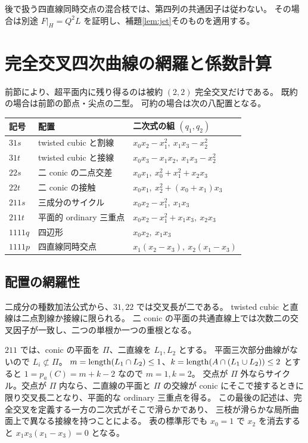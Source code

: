 \documentclass[11pt,a4paper]{ltjsarticle}
\theoremstyle{remark}\newtheorem{remark}[theorem]{注意}
\begin{document}
後で扱う四直線同時交点の混合枝では、第四列の共通因子は従わない。
その場合は別途 $F|_H=Q^2L$ を証明し、補題\ref{lem:jet}そのものを適用する。



\section{完全交叉四次曲線の網羅と係数計算}\label{sec:ci}

前節により、超平面内に残り得るのは被約 $(2,2)$ 完全交叉だけである。
既約の場合は前節の節点・尖点の二型。
可約の場合は次の八配置となる。

\begin{center}\small
\begin{tabular}{@{}lll@{}}
\toprule
記号 & 配置 & 二次式の組 $(q_1,q_2)$\\
\midrule
$31s$ & twisted cubic と割線 & $x_0x_2-x_1^2,\ x_1x_3-x_2^2$\\
$31t$ & twisted cubic と接線 & $x_0x_3-x_1x_2,\ x_1x_3-x_2^2$\\
$22s$ & 二 conic の二点交差 & $x_0x_1,\ x_0^2+x_1^2+x_2x_3$\\
$22t$ & 二 conic の接触 & $x_0x_1,\ x_2^2+(x_0+x_1)x_3$\\
$211s$ & 三成分のサイクル & $x_0x_2-x_1^2,\ x_1x_3$\\
$211t$ & 平面的 ordinary 三重点 & $x_0x_2-x_1^2+x_1x_3,\ x_2x_3$\\
$1111q$ & 四辺形 & $x_0x_2,\ x_1x_3$\\
$1111p$ & 四直線同時交点 & $x_1(x_2-x_3),\ x_2(x_1-x_3)$\\
\bottomrule
\end{tabular}\end{center}

\subsection{配置の網羅性}

二成分の種数加法公式から、$31,22$ では交叉長が二である。
twisted cubic と直線は二点割線か接線に限られる。
二 conic の平面の共通直線上では次数二の交叉因子が一致し、二つの単根か一つの重根となる。

$211$ では、conic の平面を $\Pi$、二直線を $L_1,L_2$ とする。
平面三次部分曲線がないので $L_i\not\subset\Pi$。
$m=\operatorname{length}(L_1\cap L_2)\le1$、$k=\operatorname{length}(A\cap(L_1\cup L_2))\le2$ とすると
$1=p_a(C)=m+k-2$ なので $m=1,k=2$。
交点が $\Pi$ 外ならサイクル。交点が $\Pi$ 内なら、二直線の平面と $\Pi$ の交線が
conic にそこで接するときに限り交叉長二となり、平面的な ordinary 三重点を得る。
この最後の記述は、完全交叉を定義する一方の二次式がそこで滑らかであり、
三枝が滑らかな局所曲面上で異なる接線を持つことによる。
表の標準形でも $x_0=1$ で $x_2$ を消去すると $x_1x_3(x_1-x_3)=0$ となる。
\end{document}
